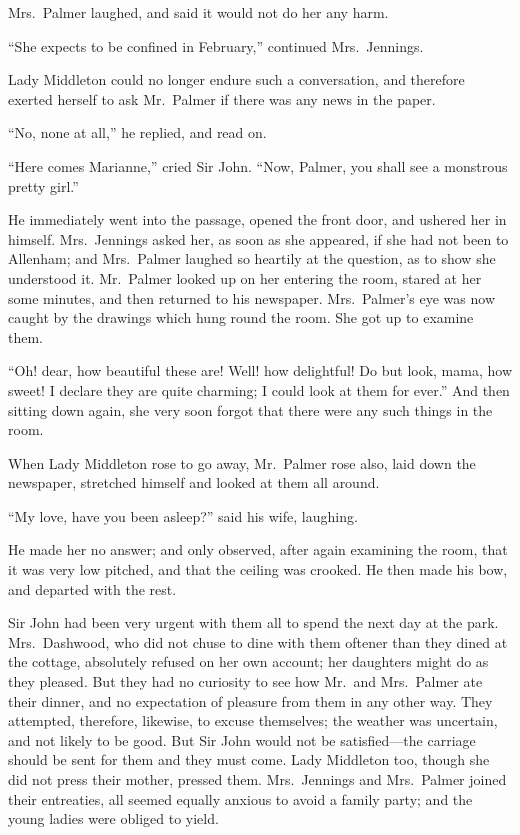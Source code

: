 Mrs.\ Palmer laughed, and said it would not do her
any harm.

``She expects to be confined in February,''
continued Mrs.\ Jennings.

Lady Middleton could no longer endure such a conversation,
and therefore exerted herself to ask Mr.\ Palmer if there
was any news in the paper.

``No, none at all,'' he replied, and read on.

``Here comes Marianne,'' cried Sir John.  ``Now, Palmer,
you shall see a monstrous pretty girl.''

He immediately went into the passage, opened the front door,
and ushered her in himself.  Mrs.\ Jennings asked her,
as soon as she appeared, if she had not been to Allenham;
and Mrs.\ Palmer laughed so heartily at the question,
as to show she understood it.  Mr.\ Palmer looked up
on her entering the room, stared at her some minutes,
and then returned to his newspaper.  Mrs.\ Palmer's eye
was now caught by the drawings which hung round the room.
She got up to examine them.

``Oh! dear, how beautiful these are!  Well! how delightful!
Do but look, mama, how sweet! I declare they are quite charming;
I could look at them for ever.'' And then sitting down again,
she very soon forgot that there were any such things in the room.

When Lady Middleton rose to go away, Mr.\ Palmer
rose also, laid down the newspaper, stretched himself
and looked at them all around.

``My love, have you been asleep?'' said his wife, laughing.

He made her no answer; and only observed, after again
examining the room, that it was very low pitched,
and that the ceiling was crooked.  He then made his bow,
and departed with the rest.

Sir John had been very urgent with them all to
spend the next day at the park.  Mrs.\ Dashwood, who did
not chuse to dine with them oftener than they dined
at the cottage, absolutely refused on her own account;
her daughters might do as they pleased.  But they had no
curiosity to see how Mr.\ and Mrs.\ Palmer ate their dinner,
and no expectation of pleasure from them in any other way.
They attempted, therefore, likewise, to excuse themselves;
the weather was uncertain, and not likely to be good.
But Sir John would not be satisfied---the carriage should
be sent for them and they must come.  Lady Middleton too,
though she did not press their mother, pressed them.
Mrs.\ Jennings and Mrs.\ Palmer joined their entreaties, all
seemed equally anxious to avoid a family party; and the young
ladies were obliged to yield.

